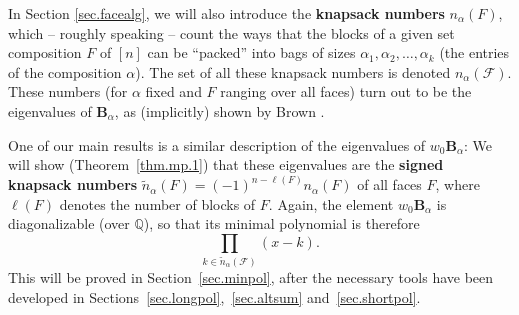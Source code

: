 \documentclass[12pt]{article}
\theoremstyle{definition}%
\theoremstyle{definition}%
\theoremstyle{remark}%
\newcommand{\tup}[1]{\left( #1 \right)}
\newcommand{\interval}[1]{\left[ #1 \right]} %
\newcommand{\QQ}{\mathbb{Q}}
\newcommand{\BBa}{\mathbf{B}_{\alpha}}
\newcommand{\CF}{\mathcal{F}}
\newcommand{\wo}{w_0} %
\newcommand{\na}{n_{ \alpha } }%
\newcommand{\nna}{\widetilde{n}_{ \alpha } }%
\newcommand{\defin}[1]{\textbf{#1}}
\begin{document}
In Section \ref{sec.facealg}, we will also introduce the \defin{knapsack numbers} $ \na\tup{ F } $, which -- roughly speaking -- count the ways that the blocks of a given set composition $F$ of $ \interval{n}$ can be ``packed'' into bags of sizes $ \alpha_1, \alpha_2, \ldots, \alpha_k $ (the entries of the composition $\alpha$).
The set of all these knapsack numbers is denoted $ \na\tup{ \CF } $.
These numbers (for $\alpha$ fixed and $F$ ranging over all faces) turn out to be the eigenvalues of $\BBa$, as (implicitly) shown by Brown \cite[Theorem 4.1]{Schocker}.


One of our main results is a similar description of the eigenvalues of $\wo\BBa$:
We will show (Theorem~\ref{thm.mp.1}) that these eigenvalues are the \defin{signed knapsack numbers} $\nna\tup{F} = \tup{-1}^{n - \ell\tup{F}} \na\tup{F}$ of all faces $F$, where $\ell\tup{F}$ denotes the number of blocks of $F$.
Again, the element $\wo\BBa$ is diagonalizable (over $\QQ$), so that its minimal polynomial is therefore
\[
\prod_{k \in \nna\tup{\CF}} \tup{x-k} .
\]
This will be proved in Section~\ref{sec.minpol}, after the necessary tools have been developed in Sections~\ref{sec.longpol},~\ref{sec.altsum} and~\ref{sec.shortpol}.

\end{document}
